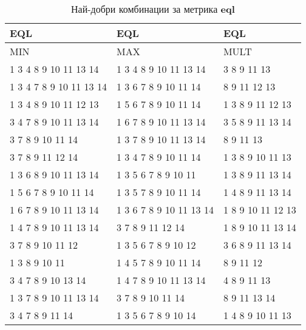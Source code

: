 \begin{table}[!htb] 
  \begin{tabular}{|l|l|l|}
\hline 
\hline 
EQL &	EQL &	EQL\\ 
\hline 
MIN &	MAX &	MULT\\ 
\hline 
1 3 4 8 9 10 11 13 14 &	1 3 4 8 9 10 11 13 14 &	3 8 9 11 13 \\ 
\hline 
1 3 4 7 8 9 10 11 13 14 &	1 3 6 7 8 9 10 11 14 &	8 9 11 12 13 \\ 
\hline 
1 3 4 8 9 10 11 12 13 &	1 5 6 7 8 9 10 11 14 &	1 3 8 9 11 12 13 \\ 
\hline 
3 4 7 8 9 10 11 13 14 &	1 6 7 8 9 10 11 13 14 &	3 5 8 9 11 13 14 \\ 
\hline 
3 7 8 9 10 11 14 &	1 3 7 8 9 10 11 13 14 &	8 9 11 13 \\ 
\hline 
3 7 8 9 11 12 14 &	1 3 4 7 8 9 10 11 14 &	1 3 8 9 10 11 13 \\ 
\hline 
1 3 6 8 9 10 11 13 14 &	1 3 5 6 7 8 9 10 11 &	1 3 8 9 11 13 14 \\ 
\hline 
1 5 6 7 8 9 10 11 14 &	1 3 5 7 8 9 10 11 14 &	1 4 8 9 11 13 14 \\ 
\hline 
1 6 7 8 9 10 11 13 14 &	1 3 6 7 8 9 10 11 13 14 &	1 8 9 10 11 12 13 \\ 
\hline 
1 4 7 8 9 10 11 13 14 &	3 7 8 9 11 12 14 &	1 8 9 10 11 13 14 \\ 
\hline 
3 7 8 9 10 11 12 &	1 3 5 6 7 8 9 10 12 &	3 6 8 9 11 13 14 \\ 
\hline 
1 3 8 9 10 11 &	1 4 5 7 8 9 10 11 14 &	8 9 11 12 \\ 
\hline 
3 4 7 8 9 10 13 14 &	1 4 7 8 9 10 11 13 14 &	4 8 9 11 13 \\ 
\hline 
1 3 7 8 9 10 11 13 14 &	3 7 8 9 10 11 14 &	8 9 11 13 14 \\ 
\hline 
3 4 7 8 9 11 14 &	1 3 5 6 7 8 9 10 14 &	1 4 8 9 10 11 13 \\ 
\hline 
 \end{tabular}
 \label{tab:lab_eql}
\caption{Най-добри комбинации за метрика \textbf{eql}}
 \end{table}